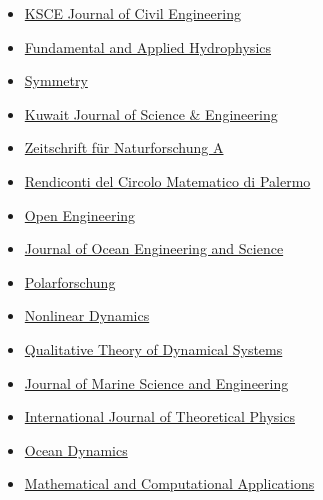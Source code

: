 \documentclass[final, a4paper, oneside, 12pt]{article}
\numberwithin{equation}{section}
\begin{document}
\begin{itemize}
    \item \href{http://www.springer.com/engineering/civil+engineering/journal/12205}{KSCE Journal of Civil Engineering}
    
    \item \href{http://hydrophysics.info/?lang=en}{Fundamental and Applied Hydrophysics}
    
    \item \href{http://www.mdpi.com/journal/symmetry}{Symmetry}
    
    \item \href{http://pubcouncil.kuniv.edu.kw/kjs/}{Kuwait Journal of Science \& Engineering}
    
    \item \href{http://www.degruyter.com/view/j/zna}{Zeitschrift f\"ur Naturforschung A}
    
    \item \href{http://www.springer.com/mathematics/journal/12215}{Rendiconti del Circolo Matematico di Palermo }
    
    \item \href{https://www.degruyter.com/view/j/eng}{Open Engineering}

    \item \href{https://www.sciencedirect.com/journal/journal-of-ocean-engineering-and-science/}{Journal of Ocean Engineering and Science}
    
    \item \href{http://www.polarforschung.de/}{Polarforschung}
    
    \item \href{https://link.springer.com/journal/11071}{Nonlinear Dynamics}

    \item \href{https://link.springer.com/journal/12346}{Qualitative Theory of Dynamical Systems}

    \item \href{https://www.mdpi.com/journal/jmse/}{Journal of Marine Science and Engineering}

    \item \href{https://link.springer.com/journal/10773/}{International Journal of Theoretical Physics}

    \item \href{https://link.springer.com/journal/10236/}{Ocean Dynamics}
    
    \item \href{https://www.mdpi.com/journal/mca/}{Mathematical and Computational Applications}


\end{itemize}
\end{document}
